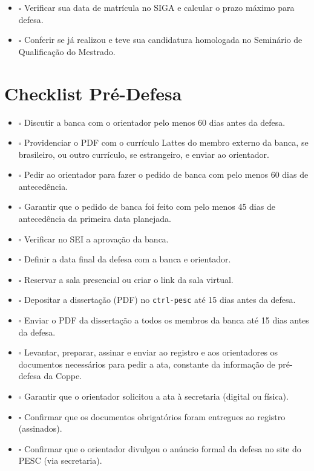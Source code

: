 \documentclass[a4paper,12pt]{article}
\begin{document}
\begin{itemize}
    \item $\square$ Verificar sua data de matrícula no SIGA e calcular o prazo máximo para defesa.
    \item $\square$ Conferir se já realizou e teve sua candidatura homologada no Seminário de Qualificação do Mestrado.
\end{itemize}
\clearpage
\section{Checklist Pré-Defesa}

\begin{itemize}
    \item $\square$ Discutir a banca com o orientador pelo menos 60 dias antes da defesa.
    \item $\square$ Providenciar o PDF com o currículo Lattes do membro externo da banca, se brasileiro, ou outro currículo, se estrangeiro, e enviar ao orientador.
    \item $\square$ Pedir ao orientador para fazer o pedido de banca com pelo menos 60 dias de antecedência.
    \item $\square$ Garantir que o pedido de banca foi feito com pelo menos 45 dias de antecedência da primeira data planejada.
    \item $\square$ Verificar no SEI a aprovação da banca.
    \item $\square$ Definir a data final da defesa com a banca e orientador.
    \item $\square$ Reservar a sala presencial ou criar o link da sala virtual.
    \item $\square$ Depositar a dissertação (PDF) no \verb|ctrl-pesc| até 15 dias antes da defesa.
    \item $\square$ Enviar o PDF da dissertação a todos os membros da banca até 15 dias antes da defesa.
    \item $\square$ Levantar, preparar, assinar e enviar ao registro e aos orientadores os documentos necessários para pedir a ata, constante da informação de pré-defesa da Coppe.
    \item $\square$ Garantir que o orientador solicitou a ata à secretaria (digital ou física).
    \item $\square$ Confirmar que os documentos obrigatórios foram entregues ao registro (assinados).
    \item $\square$ Confirmar que o orientador divulgou o anúncio formal da defesa no site do PESC (via secretaria).
\end{itemize}
\clearpage
\end{document}
